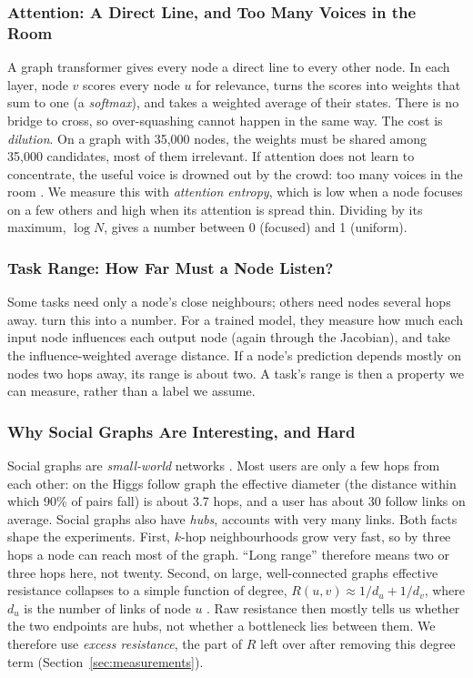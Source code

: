 \subsubsection{Attention: A Direct Line, and Too Many Voices in the Room}
A graph transformer \citep{vaswani2017,dwivedi2021} gives every node a direct line to every other node. In each layer, node $v$ scores every node $u$ for relevance, turns the scores into weights that sum to one (a \emph{softmax}), and takes a weighted average of their states. There is no bridge to cross, so over-squashing cannot happen in the same way. The cost is \emph{dilution}. On a graph with 35,000 nodes, the weights must be shared among 35,000 candidates, most of them irrelevant. If attention does not learn to concentrate, the useful voice is drowned out by the crowd: too many voices in the room \citep{xing2024}. We measure this with \emph{attention entropy}, which is low when a node focuses on a few others and high when its attention is spread thin. Dividing by its maximum, $\log N$, gives a number between 0 (focused) and 1 (uniform).

\subsubsection{Task Range: How Far Must a Node Listen?}
Some tasks need only a node's close neighbours; others need nodes several hops away. \citet{bamberger2025} turn this into a number. For a trained model, they measure how much each input node influences each output node (again through the Jacobian), and take the influence-weighted average distance. If a node's prediction depends mostly on nodes two hops away, its range is about two. A task's range is then a property we can measure, rather than a label we assume.

\subsubsection{Why Social Graphs Are Interesting, and Hard}
Social graphs are \emph{small-world} networks \citep{f_watts1998}. Most users are only a few hops from each other: on the Higgs follow graph the effective diameter (the distance within which 90\% of pairs fall) is about 3.7 hops, and a user has about 30 follow links on average. Social graphs also have \emph{hubs}, accounts with very many links. Both facts shape the experiments. First, $k$-hop neighbourhoods grow very fast, so by three hops a node can reach most of the graph. ``Long range'' therefore means two or three hops here, not twenty. Second, on large, well-connected graphs effective resistance collapses to a simple function of degree, $R(u,v)\approx 1/d_u+1/d_v$, where $d_u$ is the number of links of node $u$ \citep{f_vonluxburg2014}. Raw resistance then mostly tells us whether the two endpoints are hubs, not whether a bottleneck lies between them. We therefore use \emph{excess resistance}, the part of $R$ left over after removing this degree term (Section~\ref{sec:measurements}).

